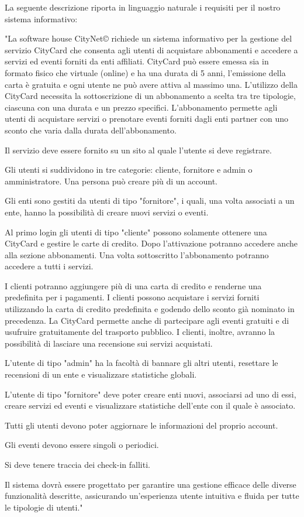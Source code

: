 La seguente descrizione riporta in linguaggio naturale i requisiti per il nostro sistema informativo:

\begin{adjustwidth}{}{}
"La software house CityNet© richiede un sistema informativo per la gestione del servizio CityCard che consenta agli utenti di acquistare abbonamenti e accedere a servizi ed eventi forniti da enti affiliati. CityCard può essere emessa sia in formato fisico che virtuale (online) e ha una durata di 5 anni, l'emissione della carta è gratuita e ogni utente ne può avere attiva al massimo una.
L'utilizzo della CityCard necessita la sottoscrizione di un abbonamento a scelta tra tre tipologie, ciascuna con una durata e un prezzo specifici. 
L'abbonamento permette agli utenti di acquistare servizi o prenotare eventi forniti dagli enti partner con uno sconto che varia dalla durata dell'abbonamento.

Il servizio deve essere fornito su un sito al quale l'utente si deve registrare.

Gli utenti si suddividono in tre categorie: cliente, fornitore e admin o amministratore. Una persona può creare più di un account.

Gli enti sono gestiti da utenti di tipo "fornitore", i quali, una volta associati a un ente, hanno la possibilità di creare nuovi servizi o eventi. 

Al primo login gli utenti di tipo "cliente" possono solamente ottenere una CityCard e gestire le carte di credito. Dopo l'attivazione potranno accedere anche alla sezione abbonamenti. Una volta sottoscritto l'abbonamento potranno accedere a tutti i servizi.

I clienti potranno aggiungere più di una carta di credito e renderne una predefinita per i pagamenti.
I clienti possono acquistare i servizi forniti utilizzando la carta di credito predefinita e godendo dello sconto già nominato in precedenza. La CityCard permette anche di partecipare agli eventi gratuiti e di usufruire gratuitamente del trasporto pubblico. 
I clienti, inoltre, avranno la possibilità di lasciare una recensione sui servizi acquistati.

L'utente di tipo "admin" ha la facoltà di bannare gli altri utenti, resettare le recensioni di un ente e visualizzare statistiche globali.

L'utente di tipo "fornitore" deve poter creare enti nuovi, associarsi ad uno di essi, creare servizi ed eventi e visualizzare statistiche dell'ente con il quale è associato.

Tutti gli utenti devono poter aggiornare le informazioni del proprio account.

Gli eventi devono essere singoli o periodici. 

Si deve tenere traccia dei check-in falliti.

Il sistema dovrà essere progettato per garantire una gestione efficace delle diverse funzionalità descritte, assicurando un'esperienza utente intuitiva e fluida per tutte le tipologie di utenti."
\end{adjustwidth}